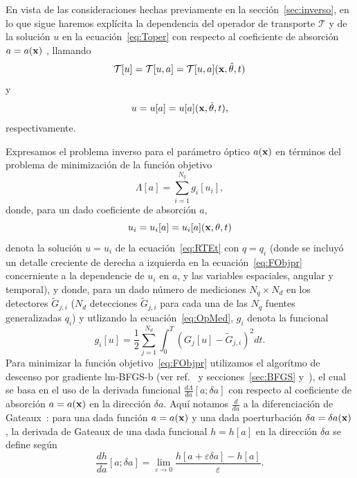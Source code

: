 En vista de las consideraciones hechas previamente en la sección~\ref{sec:inverso}, 
en lo que sigue haremos explícita la dependencia del operador de transporte 
$\mathcal{T}$ y de la solución $u$ en la ecuación~\eqref{eq:Toper} 
con respecto al coeficiente de absorción $a=a(\mathbf{x})$ , llamando 
\begin{equation}\label{eq:Toper_a}
  \mathcal{T}[u] = \mathcal{T}[u,a]= \mathcal{T}[u,a](\mathbf{x},\hat{\theta},t)
\end{equation}
y
\begin{equation}\label{u_of_a}
  u=u[a]=u[a](\mathbf{x},\hat{\theta},t),
\end{equation}
respectivamente.

Expresamos el problema inverso para el parámetro óptico  $a(\mathbf{x})$ 
en términos del problema de minimización de la función objetivo
\begin{equation}
  \Lambda[a]=\sum_{i=1}^{N_q} g_i[u_i],
\label{eq:FObjpr}
\end{equation}
donde, para un dado coeficiente de absorción $a$,
\begin{equation}\label{ui_of_a}
  u_i = u_i[a] = u_i[a](\mathbf{x},\theta,t)
\end{equation}
denota la solución $u=u_i$ de la ecuación~\eqref{eq:RTEt} con $q=q_i$ 
(donde se incluyó un detalle creciente de derecha a izquierda en la ecuación~\eqref{eq:FObjpr}
concerniente a la dependencie de $u_i$ en $a$, y las variables espaciales, angular y temporal), 
y donde, para un dado número de mediciones $N_q \times N_d$ en los detectores $\tilde{G}_{j,i}$ 
($N_d$ detecciones $\tilde{G}_{j,i}$ para cada una de las $N_q$ fuentes generalizadas $q_i$) 
y utlizando la ecuación~\eqref{eq:OpMed}, $g_i$ denota la funcional 
\begin{equation}
  g_i[u] = \frac{1}{2} \sum_{j=1}^{N_d} \int_0^T (G_j[u]-\tilde
  {G}_{j,i})^2 dt.
\label{eq:FObj}
\end{equation}
Para minimizar la función objetivo~\eqref{eq:FObjpr} utilizamos el algorítmo 
de descenso por gradiente 
lm-BFGS-b (ver ref.~\cite{Byrd1995} y secciones~\ref{sec:BFGS} y~\label{sec:lmBFGS}), 
el cual se basa en el uso de la derivada funcional $\frac{d\Lambda}{da} [a;\delta a]$ 
con respecto al coeficiente de absorción $a = a(\mathbf{x})$ en la dirección $\delta a$. 
Aquí notamos $\frac{d}{da}$ a la diferenciación de Gateaux~\cite{Hille1974}: 
para una dada función $a= a(\mathbf{x})$ y una dada poerturbación $\delta a= \delta a(\mathbf{x})$, 
la derivada de Gateaux de una dada funcional $h = h[a]$ en la dirección $\delta a$ 
se define según
\begin{equation}\label{gateaux}
  \frac{dh}{da}[a; \delta a ] = \lim_{\varepsilon \to 0} \frac{h[a +\varepsilon \delta a]
    - h[a]}{\varepsilon}.
\end{equation}
